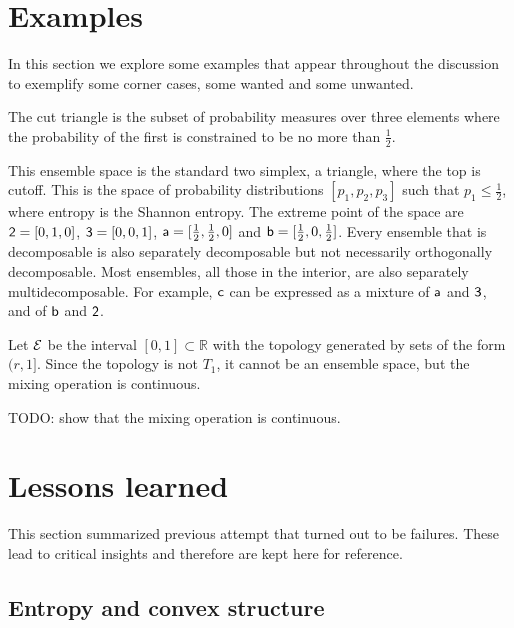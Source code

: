 \section{Examples}

In this section we explore some examples that appear throughout the discussion to exemplify some corner cases, some wanted and some unwanted.

\begin{example}\label{pm_es_cutTriangle}
	The cut triangle is the subset of probability measures over three elements where the probability of the first is constrained to be no more than $\frac{1}{2}$.
\end{example}

This ensemble space is the standard two simplex, a triangle, where the top is cutoff. This is the space of probability distributions $[p_1, p_2, p_3]$ such that $p_1 \leq \frac{1}{2}$, where entropy is the Shannon entropy. The extreme point of the space are $\ens[2] = [0,1,0]$, $\ens[3] = [0,0,1]$, $\ens[a] = [\frac{1}{2},\frac{1}{2},0]$ and $\ens[b] = [\frac{1}{2},0,\frac{1}{2}]$. Every ensemble that is decomposable is also separately decomposable but not necessarily orthogonally decomposable. Most ensembles, all those in the interior, are also separately multidecomposable. For example, $\ens[c]$ can be expressed as a mixture of $\ens[a]$ and $\ens[3]$, and of $\ens[b]$ and $\ens[2]$.

\begin{example}
	Let $\Ens$ be the interval $[0,1] \subset \mathbb{R}$ with the topology generated by sets of the form $(r,1]$. Since the topology is not $T_1$, it cannot be an ensemble space, but the mixing operation is continuous.
\end{example}

TODO: show that the mixing operation is continuous.

\section{Lessons learned}

This section summarized previous attempt that turned out to be failures. These lead to critical insights and therefore are kept here for reference.

\subsection{Entropy and convex structure}

